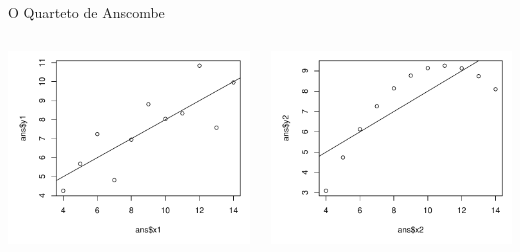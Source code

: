 \documentclass{beamer}\usepackage[]{graphicx}\usepackage[]{color}
\newenvironment{knitrout}{}{} %
\renewenvironment{knitrout}{\setlength{\topsep}{0mm}}{}
\begin{document}
\begin{frame}[fragile]{O Quarteto de Anscombe}

\begin{columns}[c]


\begin{knitrout}
\color{fgcolor}
\includegraphics[width=0.9\linewidth]{figure/ans12-1} 

\includegraphics[width=0.9\linewidth]{figure/ans12-2} 

\end{knitrout}



\end{columns}
\end{frame}
\end{document}
